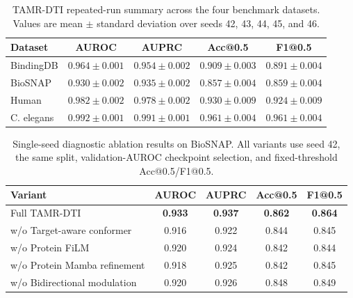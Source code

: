 \begin{table}[!htbp]
\centering
\caption{TAMR-DTI repeated-run summary across the four benchmark datasets. Values are mean $\pm$ standard deviation over seeds 42, 43, 44, 45, and 46.}
\label{tab:si_tamr_main_summary}
\scriptsize
\setlength{\tabcolsep}{5pt}
\begin{tabular}{lcccc}
\toprule
Dataset & AUROC & AUPRC & Acc@0.5 & F1@0.5 \\
\midrule
BindingDB & \textbf{$0.964\pm0.001$} & \textbf{$0.954\pm0.002$} & \textbf{$0.909\pm0.003$} & \textbf{$0.891\pm0.004$} \\
BioSNAP & \textbf{$0.930\pm0.002$} & \textbf{$0.935\pm0.002$} & \textbf{$0.857\pm0.004$} & \textbf{$0.859\pm0.004$} \\
Human & \textbf{$0.982\pm0.002$} & \textbf{$0.978\pm0.002$} & \textbf{$0.930\pm0.009$} & \textbf{$0.924\pm0.009$} \\
C. elegans & \textbf{$0.992\pm0.001$} & \textbf{$0.991\pm0.001$} & \textbf{$0.961\pm0.004$} & \textbf{$0.961\pm0.004$} \\
\bottomrule
\end{tabular}
\end{table}

\begin{table}[!htbp]
\centering
\caption{Single-seed diagnostic ablation results on BioSNAP. All variants use seed 42, the same split, validation-AUROC checkpoint selection, and fixed-threshold Acc@0.5/F1@0.5.}
\label{tab:si_biosnap_ablation}
\scriptsize
\setlength{\tabcolsep}{4pt}
\begin{tabular}{lcccc}
\toprule
Variant & AUROC & AUPRC & Acc@0.5 & F1@0.5 \\
\midrule
Full TAMR-DTI & \textbf{0.933} & \textbf{0.937} & \textbf{0.862} & \textbf{0.864} \\
w/o Target-aware conformer & 0.916 & 0.922 & 0.844 & 0.845 \\
w/o Protein FiLM & 0.920 & 0.924 & 0.842 & 0.844 \\
w/o Protein Mamba refinement & 0.918 & 0.925 & 0.842 & 0.845 \\
w/o Bidirectional modulation & 0.920 & 0.926 & 0.848 & 0.849 \\
\bottomrule
\end{tabular}
\end{table}

